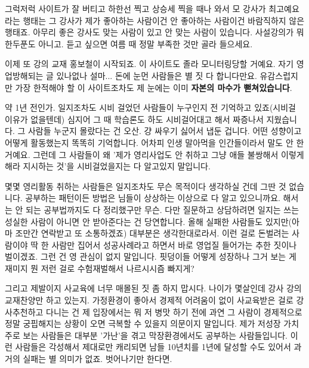그럭저럭 사이트가 잘 버티고 하한선 찍고 상승세 찍을 때나 와서 모 강사가 최고예요라는 행태는
그 강사가 제가 좋아하는 사람이건 안 좋아하는 사람이건 바람직하지 않은 행태죠.
아무리 좋은 강사도 맞는 사람이 있고 안 맞는 사람이 있습니다.
사설강의가 뭐 한두푼도 아니고. 듣고 싶으면 여름 때 정말 부족한 것만 골라 들으세요.
\vspace{5mm}

이제 또 강의 교재 홍보철이 시작되죠.
이 사이트도 졸라 모니터링당할 거예요. 자기 영업방해되는 글 있나없나
설마... 돈에 눈먼 사람들은 별 짓 다 합니다만요.
유감스럽지만 가장 한적해야 할 이 사이트조차도 제 눈에는 이미 \textbf{자본의 마수가 뻗쳐있습니다}.
\vspace{5mm}

약 1년 전인가. 일지조차도 시비 걸었던 사람들이 누구인지 전 기억하고 있죠(시비걸 이유가 없을텐데)
심지어 그 때 학습론도 하도 시비걸어대고 해서 짜증나서 지웠습니다.
그 사람들 누군지 몰랐다는 건 오산. 걍 싸우기 싫어서 냅둔 겁니다. 어떤 성향이고 어떻게 활동했는지 똑똑히 기억합니다.
어차피 인생 말아먹을 인간들이라서 말도 안 한 거예요.
그런데 그 사람들이 왜 '제가 영리사업도 안 취하고 그냥 애들 불쌍해서 이렇게 해라 지시하는 것'을 시비걸었을지는 다 알고있지 말입니다.
\vspace{5mm}

몇몇 영리활동 취하는 사람들은 일지조차도 무슨 목적이다 생각하실 건데 그딴 것 없습니다.
공부하는 패턴이든 방법은 님들이 상상하는 이상으로 다 알고 있으니까요. 해서는 안 되는 공부법까지도 다 정리했구만 무슨.
다만 질문하고 상담하려면 일지는 쓰는 성실한 사람이 아니면 안 받아준다는 건 당연합니다.
올해 실패한 사람들도 있지만(아마 조만간 연락받고 또 소통하겠죠) 대부분은 생각한대로라서.
이런 걸로 돈벌려는 사람이야 딱 한 사람만 집어서 성공사례라고 하면서 바로 영업질 들어가는 추한 짓이나 벌이겠죠.
그런 건 영 관심이 없지 말입니다. 핏덩이들 어떻게 성장하나 그거 보는 게 재미지 뭔 저런 걸로 수험재벌해서 나르시시즘 빠지게?
\vspace{5mm}

그리고 제발이지 사교육에 너무 매몰된 짓 좀 하지 맙시다. 나이가 몇살인데 강사 강의 교재찬양만 하고 있는지.
가정환경이 좋아서 경제적 어려움이 없이 사교육받은 걸로 강사추천하고 다니는 건 제 입장에서는 뭐 저 병맛 하기 전에
과연 그 사람이 경제적으로 정말 궁핍해지는 상황이 오면 극복할 수 있을지 의문이지 말입니다.
제가 저성장 가치주로 보는 사람들은 대부분 '가난'을 겪고 막장환경에서도 공부하는 사람들입니다.
이런 사람들은 각성해서 제대로만 캐리되면 남들 10년치를 1년에 달성할 수도 있어서 과거의 실패는 별 의미가 없죠.
벗어나기만 한다면.
\vspace{5mm}

